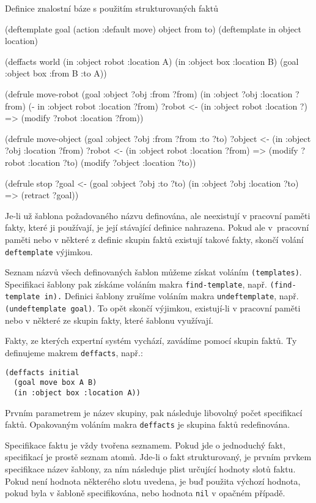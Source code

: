 \begin{listing}[h]
\caption{Definice znalostní báze s použitím strukturovaných faktů}
\label{structured facts}
\begin{clcode}
(deftemplate goal (action :default move) object from to)
(deftemplate in object location)

(deffacts world
  (in :object robot :location A)
  (in :object box :location B)
  (goal :object box :from B :to A))

(defrule move-robot
  (goal :object ?obj :from ?from)
  (in :object ?obj :location ?from)
  (- in :object robot :location ?from)
  ?robot <- (in :object robot :location ?)
  =>
  (modify ?robot :location ?from))

(defrule move-object
  (goal :object ?obj :from ?from :to ?to)
  ?object <- (in :object ?obj :location ?from)
  ?robot <- (in :object robot :location ?from)
  =>
  (modify ?robot :location ?to)
  (modify ?object :location ?to))

(defrule stop
  ?goal <- (goal :object ?obj :to ?to)
  (in :object ?obj :location ?to)
  =>
  (retract ?goal))
\end{clcode}
\end{listing}

Je-li už šablona požadovaného názvu definována, ale neexistují v pracovní
paměti fakty, které ji používají, je její stávající definice nahrazena. Pokud
ale v~pracovní paměti nebo v některé z definic skupin faktů existují takové
fakty, skončí volání \verb|deftemplate| výjimkou.

Seznam názvů všech definovaných šablon můžeme získat voláním \verb|(templates)|.
Specifikaci šablony pak získáme voláním makra
\verb|find-template|, např. \verb|(find-template in).| Definici šablony zrušíme
voláním makra \verb|undeftemplate|, např. \verb|(undeftemplate goal)|. To opět
skončí výjimkou, existují-li v pracovní paměti nebo v některé ze skupin fakty,
které šablonu využívají.

Fakty, ze kterých expertní systém vychází, zavádíme pomocí skupin faktů. Ty
definujeme makrem \verb|deffacts|, např.:
\begin{verbatim}
(deffacts initial
  (goal move box A B)
  (in :object box :location A))
\end{verbatim}
Prvním parametrem je název skupiny, pak následuje libovolný počet specifikací
faktů. Opakovaným voláním makra \verb|deffacts| je skupina faktů
redefinována.

Specifikace faktu je vždy tvořena seznamem. Pokud jde o jednoduchý fakt,
specifikací je prostě seznam atomů. Jde-li o fakt strukturovaný, je prvním
prvkem specifikace název šablony, za ním následuje plist určující hodnoty slotů
faktu. Pokud není hodnota některého slotu uvedena, je buď použita
výchozí hodnota, pokud byla v šabloně specifikována, nebo hodnota \verb|nil| v
opačném případě.

